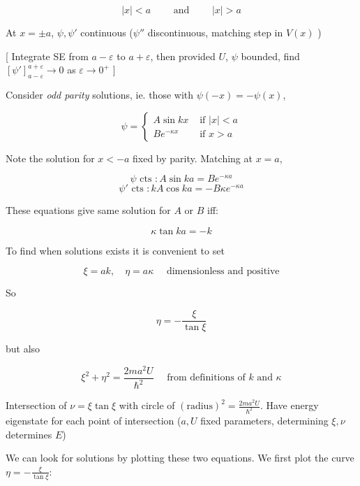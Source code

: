 \documentclass[a4paper]{article}
\begin{document}
\[ | x | < a \qquad \text{ and } \qquad | x | > a \]

At $ x = \pm a $, $ \psi,\psi' $ continuous ($ \psi'' $ discontinuous, matching step in $ V(x) $ )

[ Integrate SE from $ a - \varepsilon $ to $ a + \varepsilon $, then provided $ U $, $ \psi $ bounded, find $ [\psi']_{a - \varepsilon}^{a + \varepsilon} \to 0 $ as $ \varepsilon \to 0^{+} $ ]

Consider \emph{odd parity} solutions, ie. those with $ \psi(-x) = -\psi(x) $,

\[ \psi = \begin{cases} A \sin k x  & \text{ if } | x | < a \\ Be^{-\kappa x} & \text{ if } x > a \end{cases} \]

Note the solution for $ x < -a $ fixed by parity. Matching at $ x = a $,

\[ \psi \text{ cts }: A \sin k a = B e^{-\kappa a} \]
\[ \psi' \text{ cts }: k A \cos k a = - B \kappa e^{-\kappa a} \]

These equations give same solution for $ A $ or $ B $ iff:

\[ \kappa \tan k a = - k  \]


To find when solutions exists it is convenient to set

\[ \xi = a k, \quad \eta = a \kappa \quad \text{ dimensionless and positive} \]

So 

\[ \eta = - \frac{\xi}{\tan \xi} \]

but also 

\[ \xi^{2} +\eta^{2}= \frac{2ma^{2}U}{\hbar^{2}} \quad \text{ from definitions of } k \text{ and } \kappa \]

Intersection of $ \nu = \xi \tan \xi $ with circle of $ (\text{radius})^{2} = \frac{2ma^{2} U}{\hbar^{2}} $. Have energy eigenstate for each point of intersection ($ a,U $ fixed parameters, determining $ \xi,\nu $ determines $ E $)

We can look for solutions by plotting these two equations. We first plot the curve $\eta =  - \frac{\xi}{\tan \xi}$:

\begin{center}
\end{center}
\end{document}
